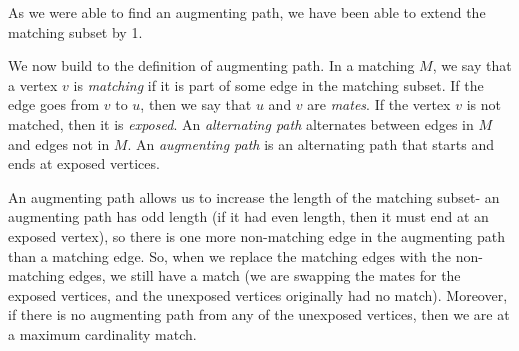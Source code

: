 \documentclass[a4paper, openany]{memoir}
\begin{document}
    \begin{figure}[H]
        \centering
    \end{figure}
    \noindent As we were able to find an augmenting path, we have been able to extend the matching subset by 1.

    We now build to the definition of augmenting path. In a matching $M$, we say that a vertex $v$ is \emph{matching} if it is part of some edge in the matching subset. If the edge goes from $v$ to $u$, then we say that $u$ and $v$ are \emph{mates}. If the vertex $v$ is not matched, then it is \emph{exposed}. An \emph{alternating path} alternates between edges in $M$ and edges not in $M$. An \emph{augmenting path} is an alternating path that starts and ends at exposed vertices.

    An augmenting path allows us to increase the length of the matching subset- an augmenting path has odd length (if it had even length, then it must end at an exposed vertex), so there is one more non-matching edge in the augmenting path than a matching edge. So, when we replace the matching edges with the non-matching edges, we still have a match (we are swapping the mates for the exposed vertices, and the unexposed vertices originally had no match). Moreover, if there is no augmenting path from any of the unexposed vertices, then we are at a maximum cardinality match.
\end{document}
